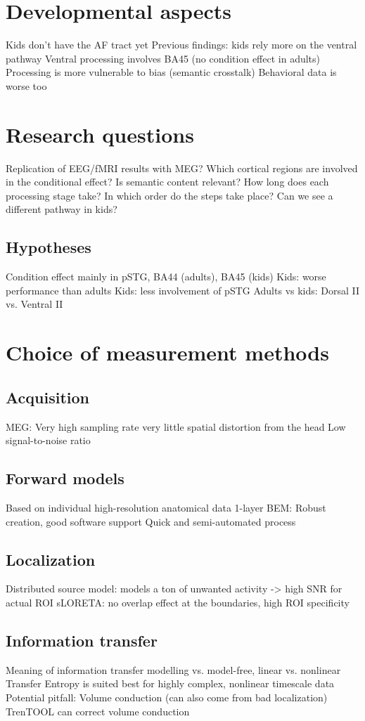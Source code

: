 \section{Developmental aspects}

Kids don't have the AF tract yet
Previous findings: kids rely more on the ventral pathway
Ventral processing involves BA45 (no condition effect in adults)
Processing is more vulnerable to bias (semantic crosstalk)
Behavioral data is worse too


\section{Research questions}

Replication of EEG/fMRI results with MEG?
Which cortical regions are involved in the conditional effect?
Is semantic content relevant?
How long does each processing stage take?
In which order do the steps take place?
Can we see a different pathway in kids?

\subsection{Hypotheses}
Condition effect mainly in pSTG, BA44 (adults), BA45 (kids)
Kids: worse performance than adults
Kids: less involvement of pSTG
Adults vs kids: Dorsal II vs. Ventral II


\section{Choice of measurement methods}

\subsection{Acquisition}
MEG: Very high sampling rate
very little spatial distortion from the head
Low signal-to-noise ratio

\subsection{Forward models}
Based on individual high-resolution anatomical data
1-layer BEM: Robust creation, good software support
Quick and semi-automated process

\subsection{Localization}
Distributed source model: models a ton of unwanted activity
-> high SNR for actual ROI
sLORETA: no overlap effect at the boundaries, high ROI specificity

\subsection{Information transfer}
Meaning of information transfer
modelling vs. model-free, linear vs. nonlinear
Transfer Entropy is suited best for highly complex, nonlinear timescale data
Potential pitfall: Volume conduction (can also come from bad localization)
TrenTOOL can correct volume conduction
